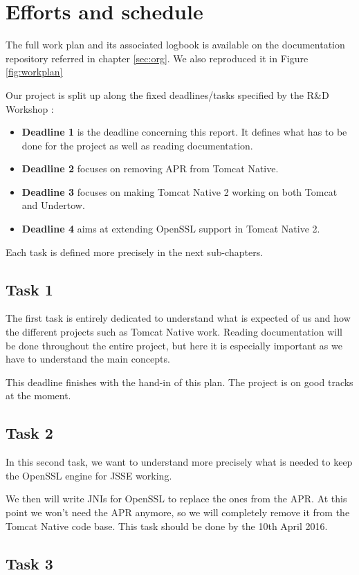 \documentclass[11pt,a4paper,bibliography=totocnumbered]{scrartcl}
\def\mytitle{Tomcat Native 2}
\begin{document}
\section{Efforts and schedule}
The full work plan and its associated logbook is available on the documentation repository referred in chapter \ref{sec:org}. We also reproduced it in Figure \ref{fig:workplan}

Our project is split up along the fixed deadlines/tasks specified by the R\&D Workshop :
\begin{itemize}
\item \textbf{Deadline 1} is the deadline concerning this report. It defines what has to be done for the project as well as reading documentation.
\item \textbf{Deadline 2} focuses on removing APR from Tomcat Native. 
\item \textbf{Deadline 3} focuses on making \mytitle{} working on both Tomcat and Undertow.
\item \textbf{Deadline 4} aims at extending OpenSSL support in \mytitle{}.
\end{itemize}

Each task is defined more precisely in the next sub-chapters.

\subsection{Task 1}
\label{subsec:task1}
The first task is entirely dedicated to understand what  is expected of us and how the different projects such as Tomcat Native work. Reading documentation will be done throughout the entire project, but here it is especially important as we have to understand the main concepts.

This deadline finishes with the hand-in of this plan. The project is on good tracks at the moment.
\subsection{Task 2}
\label{subsec:task2}

In this second task, we want to understand more precisely what is needed to keep the OpenSSL engine for JSSE working.

We then will write JNIs for OpenSSL to replace the ones from the APR. At this point we won't need the APR anymore, so we will completely remove it from the Tomcat Native code base. This task should be done by the 10th April 2016.

\subsection{Task 3}
\label{subsec:task3}
\end{document}
